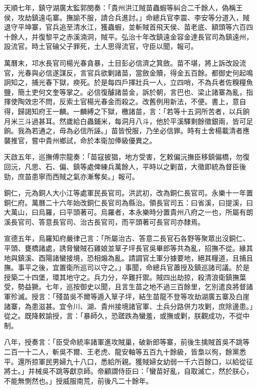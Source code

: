 \begin{pinyinscope}
天順七年，鎮守湖廣太監郭閔奏：「貴州洪江賊苗蟲蝦等糾合二千餘人，偽稱王侯，攻劫鎮遠屯寨。撫諭不服，請合兵進討。」命總兵官李震、李安等分道入，賊退守平坤寨，官兵追至清水江，獲蟲蝦，並斬賊首飛天侯、苗老底、額頭等六百四十餘人，并復黎平之赤溪湳洞，賊平。弘治十年改鎮遠金容金達長官司為鎮遠州，設流官。時土官碖父子罪死，土人思得流官，守臣以聞，報可。

萬曆末，邛水長官司楊光春貪暴，土目彭必信濟之箕斂。苗不堪，將上訴改設流官，光春與必信遂謀反，言官兵欲剿諸苗，當斂金贖，得金五百餘。都御史何起鳴詗知之，捕光春下獄，瘐死。於是每四戶擇壯兵一人，立四哨，不為兵者佐糗糧魚鹽，簡土吏何文奎等掌之。必信復醵諸苗金，訴於朝，言巴也、梁止諸寨為亂，指揮使陶效忠不問，反索土官楊光春金而殺之。改舊例用新法，不便。書上，意自得，歸謁知府王一麟。一麟縛之下獄，檄諸苗，言：「若等十五洞所苦者，以兵餉月米三斗過甚耳。然歲給白蟲鋪米，每洞月八斗，他於平溪驛剩餘徵銀兩，皆可足餉。我為若通之，毋為必信所誣。」苗皆悅服，乃坐必信罪。時有土舍楊載清者應襲推官，嘗中貴州鄉試，命於本衛加俸級優異之。

天啟五年，巡撫傅宗龍奏：「苗寇披猖，地方受害，乞敕偏沅撫臣移鎮偏橋，勿復回沅，凡思、石、偏、鎮等處俾練兵萬餘人，平時以之剿苗，大徵即統為督臣後勁，庶苗患寧而西賊之氣亦漸奪矣。」報可。

銅仁，元為銅人大小江等處軍民長官司。洪武初，改為銅仁長官司。永樂十一年置銅仁府。萬曆二十六年始改銅仁長官司為縣治。領長官司五：曰省溪，曰提溪，曰大萬山，曰烏羅，曰平頭著可。烏羅者，本永樂時分置貴州八府之一也，所屬有朗溪長官司、答意長官司、治古長官司，而平頭著可長官司亦隸焉。

宣德五年，烏羅知府嚴律己言：「所屬治古、答意二長官石各野等聚眾出沒銅仁、平頭、甕橋諸處，誘脅蠻賊石雞娘並筸子坪長官吳畢郎等共為亂，招撫不從。緣其地與鎮溪、酉陽諸蠻接境，恐相煽為亂。請調官土軍分據要地，絕其糧道，且捕且撫。事平之後，宜置衛所巡司以守之。」事聞，命總兵官蕭授及鎮巡諸司議。於是授築二十四堡，環其地守之。兵力分，卒難扞禦。賊四出劫掠，殺清浪衛鎮撫葉受，勢益獗。七年，巡按御史以聞，且言生苗之地不過三百餘里，乞別遣良將督諸軍殄滅。授言：「殘苗吳不爾等遁入筸子坪，結生苗龍不登等攻劫湖廣五寨及白崖諸寨，為患滋甚。宜令川、湖、貴州接境諸官軍、土兵分路併力攻剿，庶除邊患。」從之。既降敕諭授，言：「暴師久，恐蹉跌為蠻羞，或撫或剿，朕觀成功，不從中制。

八年，授奏言：「臣受命統率諸軍進攻賊巢，破新郎等寨，前後生擒賊首吳不跳等二百一十二人，斬吳不爾、王老虎、龍安軸等五百九十餘級，皆梟以徇，餘黨悉平。還所掠軍民男婦九十八口，悉給所親。獲賊婦女幼弱一千六百餘口，以給從征將士。」并械吳不跳等獻京師。帝顧謂侍臣曰：「蠻苗好亂，自取滅亡，然於朕心，不能無惻然也。」授威服南荒，前後凡二十餘年。


\end{pinyinscope}
